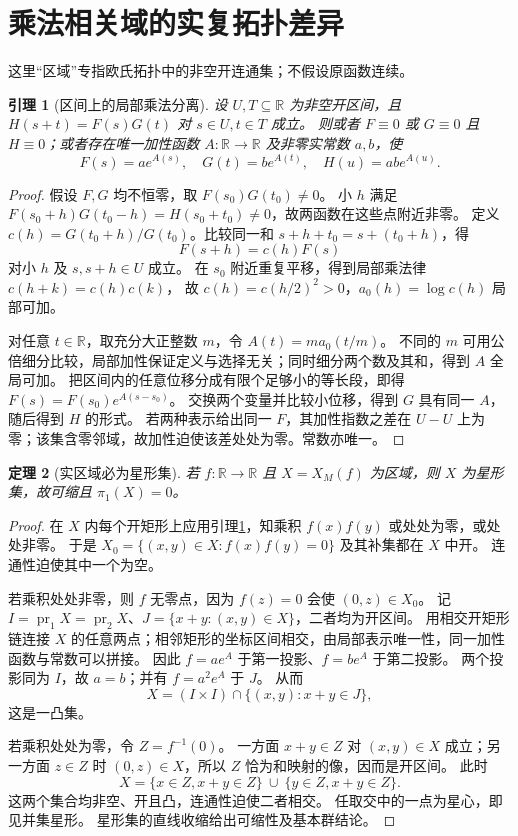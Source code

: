 \documentclass[11pt,a4paper,oneside,openany]{book}
\theoremstyle{lecture}
\newtheorem{theorem}{定理}[section]
\newtheorem{lemma}[theorem]{引理}
\newcommand{\R}{\mathbb R}
\numberwithin{equation}{section}
\begin{document}
\section{乘法相关域的实复拓扑差异}\label{geo:sec:topology}
这里“区域”专指欧氏拓扑中的非空开连通集；不假设原函数连续。

\begin{lemma}[区间上的局部乘法分离]\label{geo:lem:pexider}
设 $U,T\subseteq\R$ 为非空开区间，且 $H(s+t)=F(s)G(t)$ 对 $s\in U,t\in T$ 成立。
则或者 $F\equiv0$ 或 $G\equiv0$ 且 $H\equiv0$；或者存在唯一加性函数 $A:\R\to\R$ 及非零实常数 $a,b$，使
\[
 F(s)=ae^{A(s)},\quad G(t)=be^{A(t)},\quad H(u)=ab e^{A(u)}.
\]
\end{lemma}
\begin{proof}
假设 $F,G$ 均不恒零，取 $F(s_0)G(t_0)\ne0$。
小 $h$ 满足 $F(s_0+h)G(t_0-h)=H(s_0+t_0)\ne0$，故两函数在这些点附近非零。
定义 $c(h)=G(t_0+h)/G(t_0)$。比较同一和 $s+h+t_0=s+(t_0+h)$，得
\[
 F(s+h)=c(h)F(s)
\]
对小 $h$ 及 $s,s+h\in U$ 成立。
在 $s_0$ 附近重复平移，得到局部乘法律 $c(h+k)=c(h)c(k)$，
故 $c(h)=c(h/2)^2>0$，$a_0(h)=\log c(h)$ 局部可加。

对任意 $t\in\R$，取充分大正整数 $m$，令 $A(t)=m a_0(t/m)$。
不同的 $m$ 可用公倍细分比较，局部加性保证定义与选择无关；同时细分两个数及其和，得到 $A$ 全局可加。
把区间内的任意位移分成有限个足够小的等长段，即得
$F(s)=F(s_0)e^{A(s-s_0)}$。
交换两个变量并比较小位移，得到 $G$ 具有同一 $A$，随后得到 $H$ 的形式。
若两种表示给出同一 $F$，其加性指数之差在 $U-U$ 上为零；该集含零邻域，故加性迫使该差处处为零。常数亦唯一。
\end{proof}

\begin{theorem}[实区域必为星形集]\label{geo:thm:topreal}
若 $f:\R\to\R$ 且 $X=X_M(f)$ 为区域，则 $X$ 为星形集，故可缩且 $\pi_1(X)=0$。
\end{theorem}
\begin{proof}
在 $X$ 内每个开矩形上应用引理\ref{geo:lem:pexider}，知乘积 $f(x)f(y)$ 或处处为零，或处处非零。
于是 $X_0=\{(x,y)\in X:f(x)f(y)=0\}$ 及其补集都在 $X$ 中开。
连通性迫使其中一个为空。

若乘积处处非零，则 $f$ 无零点，因为 $f(z)=0$ 会使 $(0,z)\in X_0$。
记 $I=\operatorname{pr}_1X=\operatorname{pr}_2X$、$J=\{x+y:(x,y)\in X\}$，二者均为开区间。
用相交开矩形链连接 $X$ 的任意两点；相邻矩形的坐标区间相交，由局部表示唯一性，同一加性函数与常数可以拼接。
因此 $f=ae^A$ 于第一投影、$f=be^A$ 于第二投影。
两个投影同为 $I$，故 $a=b$；并有 $f=a^2e^A$ 于 $J$。
从而
\[
 X=(I\times I)\cap\{(x,y):x+y\in J\},
\]
这是一凸集。

若乘积处处为零，令 $Z=f^{-1}(0)$。
一方面 $x+y\in Z$ 对 $(x,y)\in X$ 成立；另一方面 $z\in Z$ 时 $(0,z)\in X$，所以 $Z$ 恰为和映射的像，因而是开区间。
此时
\[
 X=\{x\in Z,x+y\in Z\}\ \cup\ \{y\in Z,x+y\in Z\}.
\]
这两个集合均非空、开且凸，连通性迫使二者相交。
任取交中的一点为星心，即见并集星形。
星形集的直线收缩给出可缩性及基本群结论。
\end{proof}
\end{document}
